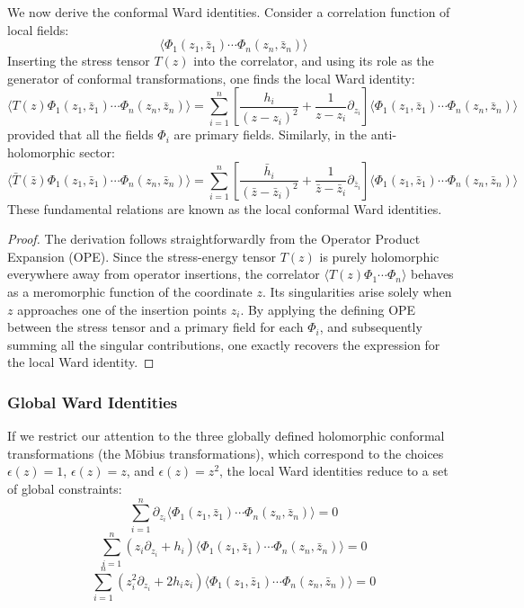 We now derive the conformal Ward identities. Consider a correlation function of local fields:
\[
    \langle \Phi_1(z_1, \bar{z}_1) \cdots \Phi_n(z_n, \bar{z}_n) \rangle
\]
Inserting the stress tensor \(T(z)\) into the correlator, and using its role as the generator of conformal transformations, one finds the local Ward identity:
\[
    \langle T(z) \Phi_1(z_1, \bar{z}_1) \cdots \Phi_n(z_n, \bar{z}_n) \rangle = \sum_{i=1}^n \left[ \frac{h_i}{(z - z_i)^2} + \frac{1}{z - z_i} \partial_{z_i} \right] \langle \Phi_1(z_1, \bar{z}_1) \cdots \Phi_n(z_n, \bar{z}_n) \rangle
\]
provided that all the fields \(\Phi_i\) are primary fields.
Similarly, in the anti-holomorphic sector:
\[
    \langle \bar{T}(\bar{z}) \Phi_1(z_1, \bar{z}_1) \cdots \Phi_n(z_n, \bar{z}_n) \rangle = \sum_{i=1}^n \left[ \frac{\bar{h}_i}{(\bar{z} - \bar{z}_i)^2} + \frac{1}{\bar{z} - \bar{z}_i} \partial_{\bar{z}_i} \right] \langle \Phi_1(z_1, \bar{z}_1) \cdots \Phi_n(z_n, \bar{z}_n) \rangle
\]
These fundamental relations are known as the local conformal Ward identities.

\begin{proof}
    The derivation follows straightforwardly from the Operator Product Expansion (OPE). Since the stress-energy tensor \(T(z)\) is purely holomorphic everywhere away from operator insertions, the correlator \(\langle T(z) \Phi_1 \cdots \Phi_n \rangle\) behaves as a meromorphic function of the coordinate \(z\). Its singularities arise solely when \(z\) approaches one of the insertion points \(z_i\). By applying the defining OPE between the stress tensor and a primary field for each \(\Phi_i\), and subsequently summing all the singular contributions, one exactly recovers the expression for the local Ward identity.
\end{proof}

\subsubsection{Global Ward Identities}

If we restrict our attention to the three globally defined holomorphic conformal transformations (the Möbius transformations), which correspond to the choices \(\epsilon(z) = 1\), \(\epsilon(z) = z\), and \(\epsilon(z) = z^2\), the local Ward identities reduce to a set of global constraints:
\[
    \sum_{i=1}^n \partial_{z_i} \langle \Phi_1(z_1, \bar{z}_1) \cdots \Phi_n(z_n, \bar{z}_n) \rangle = 0
\]
\[
    \sum_{i=1}^n (z_i \partial_{z_i} + h_i) \langle \Phi_1(z_1, \bar{z}_1) \cdots \Phi_n(z_n, \bar{z}_n) \rangle = 0
\]
\[
    \sum_{i=1}^n (z_i^2 \partial_{z_i} + 2 h_i z_i) \langle \Phi_1(z_1, \bar{z}_1) \cdots \Phi_n(z_n, \bar{z}_n) \rangle = 0
\]

